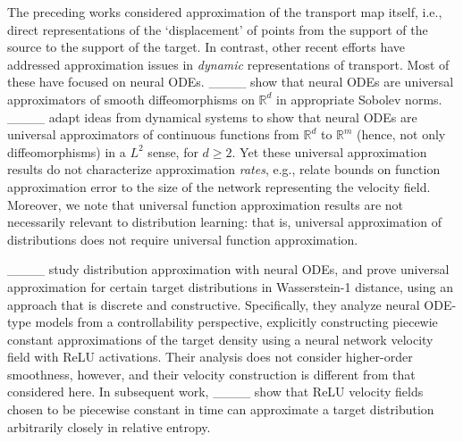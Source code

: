 The preceding works considered approximation of the transport map itself, i.e., direct representations of the `displacement' of points from the support of the source to the support of the target. In contrast, other recent efforts have addressed approximation issues in \textit{dynamic} representations of transport. Most of these have focused on neural ODEs. 
____ show that neural ODEs are universal approximators of smooth diffeomorphisms on $\mathbb{R}^d$ in appropriate Sobolev norms. ____ adapt ideas from dynamical systems to show that neural ODEs are universal approximators of continuous functions from $\mathbb{R}^d$ to $\mathbb{R}^m$ (hence, not only diffeomorphisms) in a $L^2$ sense, for $d \geq 2$. Yet these universal approximation results do not characterize approximation \emph{rates}, e.g., relate bounds on function approximation error to the size of the network representing the velocity field. Moreover, we note that universal {function} approximation results are not necessarily relevant to {distribution} learning: that is, universal approximation of distributions does not require universal function approximation.


    

____ study distribution approximation with neural ODEs, and prove universal approximation for certain target distributions in Wasserstein-1 distance, using an approach that is discrete and constructive. Specifically, they analyze neural ODE-type models from a controllability perspective, explicitly constructing piecewie constant approximations of the target density using a neural network velocity field with ReLU activations. Their analysis does not consider higher-order smoothness, however, and their velocity construction is different from that considered here. In subsequent work, ____ show that ReLU velocity fields chosen to be piecewise constant in time can approximate a target distribution arbitrarily closely in relative entropy. 
 
